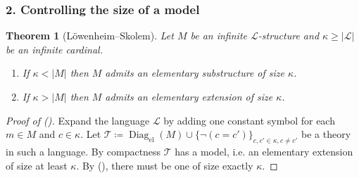\documentclass{report}
\DeclareMathOperator{\Diag}{Diag}
\theoremstyle{definition}
\theoremstyle{plain}
\newtheorem{thm}{Theorem}[section]
\theoremstyle{definition}
\begin{document}
 		\subsubsection*{2. Controlling the size of a model}
 		\begin{thm}[Löwenheim–Skolem]
 			Let $M$ be an infinite $\mathcal{L}$-structure and $\kappa \geq |\mathcal{L}|$ be an infinite cardinal.
 			\begin{enumerate}
 				\item[(\textdownarrow)] If $\kappa < |M|$ then $M$ admits an elementary substructure of size $\kappa$.
 				\item[(\textuparrow)] If $\kappa > |M|$ then $M$ admits an elementary extension of size $\kappa$.
 			\end{enumerate}
 		\end{thm}
 		\begin{proof}[Proof of (\textuparrow)]
 			Expand the language $\mathcal{L}$ by adding one constant symbol for each $m\in M$ and $c\in \kappa$. Let $\mathcal{T} \coloneqq \Diag_{\text{el}}(M)\cup \{\neg(c = c')\}_{c,c'\in \kappa, c\neq c'}$ be a theory in such a language. By compactness $\mathcal{T}$ has a model, i.e. an elementary extension of size at least $\kappa$. By (\textdownarrow), there must be one of size exactly $\kappa$.
 		\end{proof}
\end{document}
